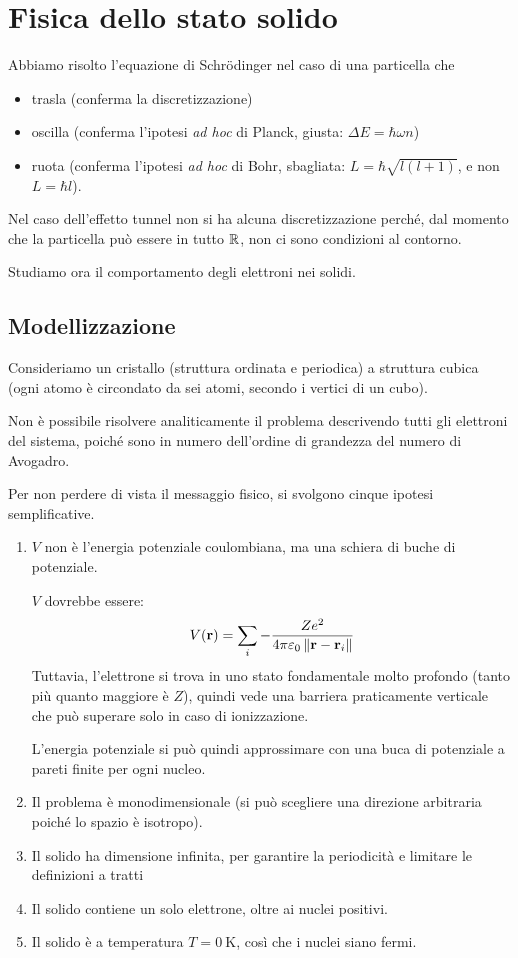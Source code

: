 \chapter{Fisica dello stato solido}

Abbiamo risolto l'equazione di Schrödinger nel caso di una particella che
\begin{itemize}
    \item trasla (conferma la discretizzazione)
    \item oscilla (conferma l'ipotesi \textit{ad hoc} di Planck, giusta: $\Delta E = \hbar \omega n$)
    \item ruota (conferma l'ipotesi \textit{ad hoc} di Bohr, sbagliata: $L = \hbar \sqrt{l (l + 1)}$, e non $L = \hbar l$).
\end{itemize}
Nel caso dell'effetto tunnel non si ha alcuna discretizzazione perché, dal momento che la particella può essere in tutto $\mathbb{R}$, non ci sono condizioni al contorno.

Studiamo ora il comportamento degli elettroni nei solidi.

\section{Modellizzazione}

Consideriamo un cristallo (struttura ordinata e periodica) a struttura cubica (ogni atomo è circondato da sei atomi, secondo i vertici di un cubo).

Non è possibile risolvere analiticamente il problema descrivendo tutti gli elettroni del sistema, poiché sono in numero dell'ordine di grandezza del numero di Avogadro.

Per non perdere di vista il messaggio fisico, si svolgono cinque ipotesi semplificative.
\begin{enumerate}
    \item $V$ non è l'energia potenziale coulombiana, ma una schiera di buche di potenziale.

    $V$ dovrebbe essere:
    \begin{equation}
        V(\mathbf{r}) = \sum_i -\frac{Z e^2}{4 \pi \varepsilon_0 \left\lVert \mathbf{r} - \mathbf{r}_i \right\rVert}
    \end{equation}
    Tuttavia, l'elettrone si trova in uno stato fondamentale molto profondo (tanto più quanto maggiore è $Z$), quindi vede una barriera praticamente verticale che può superare solo in caso di ionizzazione.

    L'energia potenziale si può quindi approssimare con una buca di potenziale a pareti finite per ogni nucleo.

    \item Il problema è monodimensionale (si può scegliere una direzione arbitraria poiché lo spazio è isotropo).
    \item Il solido ha dimensione infinita, per garantire la periodicità e limitare le definizioni a tratti
    \item Il solido contiene un solo elettrone, oltre ai nuclei positivi.
    \item Il solido è a temperatura $T = \qty{0}{\kelvin}$, così che i nuclei siano fermi.
\end{enumerate}

